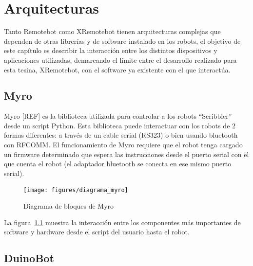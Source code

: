 \chapter{Arquitecturas}\label{ch2}



Tanto Remotebot como XRemotebot tienen arquitecturas complejas que
dependen de otras librerías y de software instalado en los robots,
el objetivo de este capítulo es describir la interacción entre los
distintos dispositivos y aplicaciones utilizadas, demarcando el límite
entre el desarrollo realizado para esta tesina, XRemotebot, con el software ya
existente con el que interactúa.

\section{Myro}\label{ch2:myro}

Myro [REF] es la biblioteca utilizada para controlar a los robots ``Scribbler''
desde un script Python. Esta biblioteca puede interactuar con los robots de 2
formas diferentes: a través de un cable serial (RS323) o bien usando bluetooth
con RFCOMM. El funcionamiento de Myro requiere que el robot tenga
cargado un firmware determinado que espera las instrucciones desde el puerto
serial con el que cuenta el robot (el adaptador bluetooth se conecta en ese
mismo puerto serial).

\begin{figure}
    \centering
    \texttt{[image: figures/diagrama\_myro]}
    \caption{Diagrama de bloques de Myro}
    \label{fig:diagrama_myro}
\end{figure}

La figura~\ref{fig:diagrama_myro} muestra la interacción entre los componentes
más importantes de software y hardware desde el script del usuario hasta el
robot.

\section{DuinoBot}\label{ch2:duinobot}

